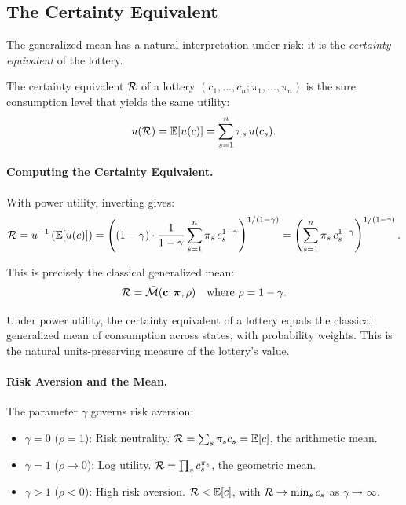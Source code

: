 \subsection{The Certainty Equivalent}
\label{subsec:certainty-equivalent}

The generalized mean has a natural interpretation under risk: it is the \emph{certainty equivalent} of the lottery.

\begin{definition}
\label{def:certainty-equivalent}
The certainty equivalent $\mathcal{R}$ of a lottery $(c_1, \ldots, c_n; \pi_1, \ldots, \pi_n)$ is the sure consumption level that yields the same utility:
\begin{equation}
u(\mathcal{R}) = \mathbb{E}[u(c)] = \sum_{s=1}^{n} \pi_s \, u(c_s).
\label{eq:ce-definition}
\end{equation}
\end{definition}

\paragraph{Computing the Certainty Equivalent.}
With power utility, inverting gives:
\begin{equation}
\mathcal{R} = u^{-1}\left( \mathbb{E}[u(c)] \right) = \left( (1-\gamma) \cdot \frac{1}{1-\gamma} \sum_{s=1}^{n} \pi_s \, c_s^{1-\gamma} \right)^{1/(1-\gamma)} = \left( \sum_{s=1}^{n} \pi_s \, c_s^{1-\gamma} \right)^{1/(1-\gamma)}.
\label{eq:ce-computation}
\end{equation}

This is precisely the classical generalized mean:
\begin{equation}
\mathcal{R} = \bar{\mathcal{M}}(\mathbf{c}; \bm{\pi}, \rho) \quad \text{where } \rho = 1 - \gamma.
\label{eq:ce-is-mean}
\end{equation}

\begin{calloutimportant}
Under power utility, the certainty equivalent of a lottery equals the classical generalized mean of consumption across states, with probability weights. This is the natural units-preserving measure of the lottery's value.
\end{calloutimportant}

\paragraph{Risk Aversion and the Mean.}
The parameter $\gamma$ governs risk aversion:
\begin{itemize}[leftmargin=2em]
    \item $\gamma = 0$ ($\rho = 1$): Risk neutrality. $\mathcal{R} = \sum_s \pi_s c_s = \mathbb{E}[c]$, the arithmetic mean.
    \item $\gamma = 1$ ($\rho \to 0$): Log utility. $\mathcal{R} = \prod_s c_s^{\pi_s}$, the geometric mean.
    \item $\gamma > 1$ ($\rho < 0$): High risk aversion. $\mathcal{R} < \mathbb{E}[c]$, with $\mathcal{R} \to \min_s c_s$ as $\gamma \to \infty$.
\end{itemize}

